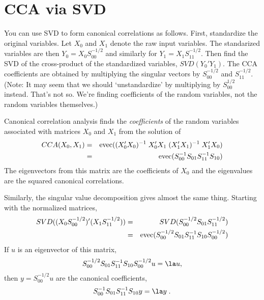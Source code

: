 \documentclass[12pt]{article}
\begin{document}
\section{ CCA via SVD }

 You can use SVD to form canonical correlations as follows. First, standardize
 the original variables. Let $X_0$ and $X_1$ denote the raw input variables.
  The standarized variables are then $Y_0 = X_0 S_{00}^{-1/2}$ and similarly for
 $Y_1 = X_1 S_{11}^{-1/2}$.  Then find the SVD of the cross-product of the
 standardized variables, $SVD(Y_0'Y_1)$. The CCA coefficients are obtained by
 multiplying the singular vectors by $S_{00}^{-1/2}$ and $S_{11}^{-1/2}$. (Note:
 It may seem that we should `unstandardize' by multiplying by $S_{00}^{1/2}$
 instead. That's not so.  We're finding coefficients of the random variables,
 not the random variables themselves.)


 Canonical correlation analysis finds the {\em coefficients} of the random
 variables associated with matrices $X_0$ and $X_1$ from the solution of
 \begin{eqnarray}
   CCA(X_0, X_1) 
     &=& \mbox{evec} 
         ( (X_0'X_0)^{-1} \; X_0'X_1 \; (X_1'X_1)^{-1} \; X_1'X_0) \cr
     &=& \mbox{evec} (S_{00}^{-1} S_{01} S_{11}^{-1} S_{10} )
 \label{eq:cca}
 \end{eqnarray}
 The eigenvectors from this matrix are the coefficients of $X_0$ and the
eigenvalues are the squared canonical correlations.

Similarly, the singular value decomposition gives almost the same thing.
Starting with the normalized matrices, 
 \begin{eqnarray}
   SVD( (X_0 S_{00}^{-1/2})' (X_1 S_{11}^{-1/2}) )
    &=& SVD(S_{00}^{-1/2} S_{01} S_{11}^{-1/2}) \cr
    &=& \mbox{evec}(S_{00}^{-1/2}S_{01}S_{11}^{-1}S_{10}S_{00}^{-1/2})
 \label{eq:svd}
 \end{eqnarray}
 If $u$ is an eigenvector of this matrix,
 \begin{displaymath}
  S_{00}^{-1/2}S_{01}S_{11}^{-1}S_{10}S_{00}^{-1/2} u = \la u,   
 \end{displaymath}
 then $y = S_{00}^{-1/2} u$ are the canonical coefficients,
 \begin{displaymath}
    S_{00}^{-1}S_{01}S_{11}^{-1}S_{10} y = \la y \;.   
 \end{displaymath}
\end{document}
